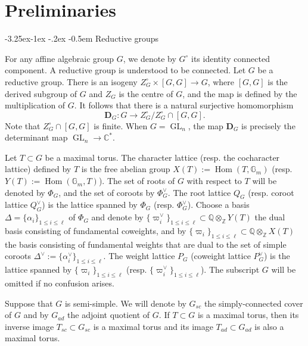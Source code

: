 \documentclass[11pt,oneside,dvipsnames]{amsart}
\makeatletter
\renewcommand\subsection{\@startsection{subsection}{3}{\z@}%
                                     {-3.25ex\@plus -1ex \@minus -.2ex}%
                                     {-0.5em}%
                                     {\normalfont\normalsize\bfseries}}
\theoremstyle{plain}
\theoremstyle{definition}
\theoremstyle{named}
\DeclareMathOperator{\GL}{GL}
\DeclareMathOperator{\Hom}{Hom}
\makeatother
\begin{document}
\section{Preliminaries}\label{sec-Pre}
\subsection{Reductive groups}\label{subsec-alg-grp}\hfill

For any affine algebraic group $G$, we denote by $G^{\circ}$ its identity connected component. A reductive group is understood to be connected. Let $G$ be a reductive group. There is an isogeny $Z_G^{\circ}\times [G,G]\rightarrow G$, where $[G,G]$ is the derived subgroup of $G$ and $Z_G$ is the centre of $G$, and the map is defined by the multiplication of $G$. It follows that there is a natural surjective homomorphism
\begin{equation}
\mathbf{D}_G:G\longrightarrow Z_G^{\circ}/Z_G^{\circ}\cap [G,G].
\end{equation}
Note that $Z_G^{\circ}\cap [G,G]$ is finite. When $G=\GL_n$, the map $\mathbf{D}_G$ is precisely the determinant map $\GL_n\rightarrow \mathbb{C}^{\ast}$.

Let $T\subset G$ be a maximal torus. The character lattice (resp. the cocharacter lattice) defined by $T$ is the free abelian group $X(T):=\Hom(T,\mathbb{G}_m)$ (resp. $Y(T):=\Hom(\mathbb{G}_m,T)$). The set of roots of $G$ with respect to $T$ will be denoted by $\Phi_G$, and the set of coroots by $\Phi_G^{\vee}$. The root lattice $Q_G$ (resp. coroot lattice $Q_G^{\vee}$) is the lattice spanned by $\Phi_G$ (resp. $\Phi_G^{\vee}$). Choose a basis $\Delta=\{\alpha_i\}_{1\le i\le\ell}$ of $\Phi_G$ and denote by $\{\varpi_i^{\vee}\}_{1\le i\le\ell}\subset\mathbb{Q}\otimes_{\mathbb{Z}}Y(T)$ the dual basis consisting of fundamental coweights, and by $\{\varpi_i\}_{1\le i\le \ell}\subset\mathbb{Q}\otimes_{\mathbb{Z}}X(T)$ the basis consisting of fundamental weights that are dual to the set of simple coroots $\Delta^{\vee}:=\{\alpha_i^{\vee}\}_{1\le i\le\ell}$. The weight lattice $P_G$ (coweight lattice $P_G^{\vee}$) is the lattice spanned by $\{\varpi_i\}_{1\le i\le \ell}$ (resp. $\{\varpi_i^{\vee}\}_{1\le i\le\ell}$). The subscript $G$ will be omitted if no confusion arises.

Suppose that $G$ is semi-simple. We will denote by $G_{sc}$ the simply-connected cover of $G$ and by $G_{ad}$ the adjoint quotient of $G$. If $T\subset G$ is a maximal torus, then its inverse image $T_{sc}\subset G_{sc}$ is a maximal torus and its image $T_{ad}\subset G_{ad}$ is also a maximal torus. 
\end{document}
